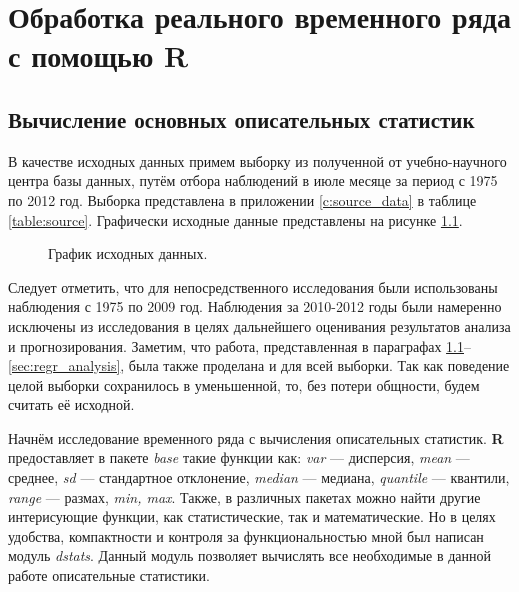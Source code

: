 \newpage

\chapter{Обработка реального временного ряда с помощью R}

\section{Вычисление основных описательных статистик} %
\label{sec:dstats}

В качестве исходных данных примем выборку из полученной от учебно-научного центра базы данных, путём отбора наблюдений в июле месяце за период с 1975 по 2012 год. Выборка представлена в приложении \ref{c:source_data} в таблице \ref{table:source}. Графически исходные данные представлены на рисунке \ref{img:input}.

\begin{figure}[ht]
\caption{График исходных данных.}
\label{img:input}
\end{figure}

Следует отметить, что для непосредственного исследования были использованы наблюдения с 1975 по 2009 год. Наблюдения за 2010-2012 годы были намеренно исключены из исследования в целях дальнейшего оценивания результатов анализа и прогнозирования. Заметим, что работа, представленная в параграфах \ref{sec:dstats}--\ref{sec:regr_analysis}, была также проделана и для всей выборки. Так как поведение целой выборки сохранилось в уменьшенной, то, без потери общности, будем считать её исходной.

Начнём исследование временного ряда с вычисления описательных статистик. \textbf{R} предоставляет в пакете \textit{base} такие функции как: \textit{var} --- дисперсия, \textit{mean} --- среднее, \textit{sd} --- стандартное отклонение, \textit{median} --- медиана, \textit{quantile} --- квантили, \textit{range} --- размах, \textit{min, max}. Также, в различных пакетах можно найти другие интерисующие функции, как статистические, так и математические. Но в целях удобства, компактности и контроля за функциональностью мной был написан модуль \textit{dstats}. Данный модуль позволяет вычислять все необходимые в данной работе описательные статистики. 
	
